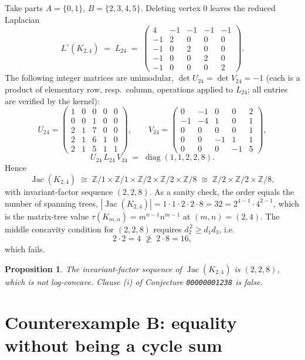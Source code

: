 \documentclass[11pt]{article}
\newtheorem{proposition}{Proposition}
\theoremstyle{definition}
\begin{document}
Take parts $A = \{0,1\}$, $B = \{2,3,4,5\}$.  Deleting vertex $0$ leaves the reduced
Laplacian
\[
L^{\circ}(K_{2,4}) \;=\; L_{24} \;=\;
\begin{pmatrix}
 4 & -1 & -1 & -1 & -1\\
-1 &  2 &  0 &  0 &  0\\
-1 &  0 &  2 &  0 &  0\\
-1 &  0 &  0 &  2 &  0\\
-1 &  0 &  0 &  0 &  2
\end{pmatrix}.
\]
The following integer matrices are unimodular, $\det U_{24} = \det V_{24} = -1$
(each is a product of elementary row, resp.\ column, operations applied to
$L_{24}$; all entries are verified by the kernel):
\[
U_{24} = \begin{pmatrix} 1&0&0&0&0\\ 0&0&1&0&0\\ 2&1&7&0&0\\ 2&1&6&1&0\\ 2&1&5&1&1 \end{pmatrix},
\qquad
V_{24} = \begin{pmatrix} 0&-1&0&0&2\\ -1&-4&1&0&1\\ 0&0&0&0&1\\ 0&0&-1&1&1\\ 0&0&0&-1&5 \end{pmatrix},
\]
\[
U_{24}\, L_{24}\, V_{24} \;=\; \operatorname{diag}(1,1,2,2,8).
\]
Hence
\[
\operatorname{Jac}(K_{2,4}) \;\cong\; \mathbb{Z}/1 \times \mathbb{Z}/1 \times
\mathbb{Z}/2 \times \mathbb{Z}/2 \times \mathbb{Z}/8 \;\cong\;
\mathbb{Z}/2 \times \mathbb{Z}/2 \times \mathbb{Z}/8 ,
\]
with invariant-factor sequence $(2,2,8)$.  As a sanity check, the order equals the
number of spanning trees,
$|\operatorname{Jac}(K_{2,4})| = 1\cdot 1\cdot 2\cdot 2\cdot 8 = 32 = 2^{4-1}\cdot
4^{2-1}$, which is the matrix-tree value $\tau(K_{m,n}) = m^{n-1} n^{m-1}$ at
$(m,n) = (2,4)$.  The middle concavity condition for $(2,2,8)$ requires
$d_2^{\,2} \ge d_1 d_3$, i.e.
\[
2 \cdot 2 = 4 \;\not\ge\; 2 \cdot 8 = 16 ,
\]
which fails.

\begin{proposition}\label{prop:A}
The invariant-factor sequence of $\operatorname{Jac}(K_{2,4})$ is $(2,2,8)$, which is
not log-concave.  Clause (i) of Conjecture \texttt{00000001238} is false.
\end{proposition}

\section{Counterexample B: equality without being a cycle sum}
\end{document}
